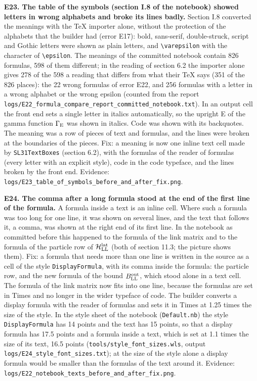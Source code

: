 \documentclass[
  10pt,
]{article}
\begin{document}
\textbf{E23. The table of the symbols (section I.8 of the notebook)
showed letters in wrong alphabets and broke its lines badly.} Section
I.8 converted the meanings with the TeX importer alone, without the
protection of the alphabets that the builder had (error E17): bold,
sans-serif, double-struck, script and Gothic letters were shown as plain
letters, and \texttt{\textbackslash{}varepsilon} with the character of
\texttt{\textbackslash{}epsilon}. The meanings of the committed notebook
contain 826 formulas, 598 of them different; in the reading of section
6.2 the importer alone gives 278 of the 598 a reading that differs from
what their TeX says (351 of the 826 places): the 22 wrong formulas of
error E22, and 256 formulas with a letter in a wrong alphabet or the
wrong epsilon (counted from the report
\texttt{logs/E22\_formula\_compare\_report\_committed\_notebook.txt}).
In an output cell the front end sets a single letter in italics
automatically, so the upright E of the gamma function \(\Gamma_{\rm E}\)
was shown in italics. Code was shown with its backquotes. The meaning
was a row of pieces of text and formulas, and the lines were broken at
the boundaries of the pieces. Fix: a meaning is now one inline text cell
made by \texttt{SL31TextBoxes} (section 6.2), with the formulas of the
reader of formulas (every letter with an explicit style), code in the
code typeface, and the lines broken by the front end. Evidence:
\texttt{logs/E23\_table\_of\_symbols\_before\_and\_after\_fix.png}.

\textbf{E24. The comma after a long formula stood at the end of the
first line of the formula.} A formula inside a text is an inline cell.
Where such a formula was too long for one line, it was shown on several
lines, and the text that follows it, a comma, was shown at the right end
of its first line. In the notebook as committed before this happened to
the formula of the link matrix and to the formula of the particle row of
\(\mathcal H^{\rm lat}_{\rm LL}\) (both of section 11.3; the picture
shows them). Fix: a formula that needs more than one line is written in
the source as a cell of the style \texttt{DisplayFormula}, with its
comma inside the formula: the particle row, and the new formula of the
bound \(B^{\rm out}_{\rm LL}\), which stood alone in a text cell. The
formula of the link matrix now fits into one line, because the formulas
are set in Times and no longer in the wider typeface of code. The
builder converts a display formula with the reader of formulas and sets
it in Times at 1.25 times the size of the style. In the style sheet of
the notebook (\texttt{Default.nb}) the style \texttt{DisplayFormula} has
14 points and the text has 15 points, so that a display formula has 17.5
points and a formula inside a text, which is set at 1.1 times the size
of its text, 16.5 points (\texttt{tools/style\_font\_sizes.wls}, output
\texttt{logs/E24\_style\_font\_sizes.txt}); at the size of the style
alone a display formula would be smaller than the formulas of the text
around it. Evidence:
\texttt{logs/E22\_notebook\_texts\_before\_and\_after\_fix.png}.
\end{document}
